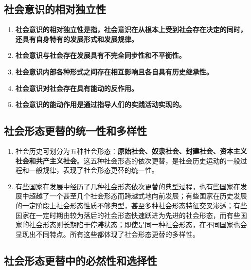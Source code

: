 \documentclass[12pt, a4paper, oneside]{ctexbook}
\begin{document}
\subsection{社会意识的相对独立性}

\begin{enumerate}
\item \textbf{社会意识的相对独立性是指，社会意识在从根本上受到社会存在决定的同时，还具有自身特有的发展形式和发展规律。}
\item \textbf{社会意识与社会存在发展具有不完全同步性和不平衡性。}
\item \textbf{社会意识内部各种形式之间存在相互影响且各自具有历史继承性。}
\item \textbf{社会意识对社会存在具有能动的反作用。}
\item \textbf{社会意识的能动作用是通过指导人们的实践活动实现的。}
\end{enumerate}

\subsection{社会形态更替的统一性和多样性}

\begin{enumerate}
\item 社会历史可划分为五种社会形态：\textbf{原始社会、奴隶社会、封建社会、资本主义社会和共产主义社会}。这五种社会形态的依次更替，是社会历史运动的一般过程和一般规律，表现了社会形态更替的统一性。
\item 有些国家在发展中经历了几种社会形态依次更替的典型过程，也有些国家在发展中超越了一个甚至几个社会形态而跨越式地向前发展；有些国家在历史发展的一定阶段上社会形态性质不够典型，甚至多种社会形态特征交叉渗透；有些国家在一定时期由较为落后的社会形态快速跃进为先进的社会形态，而有些国家的社会形态则长期陷于停滞状态；即使是同一种社会形态，在不同国家也会显现出不同特点。所有这些都体现了社会形态更替的多样性。
\end{enumerate}

\subsection{社会形态更替中的必然性和选择性}
\end{document}

